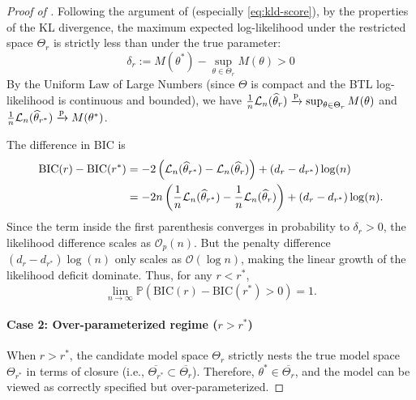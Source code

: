 \documentclass{article}
\begin{document}
\begin{bibunit}[unsrtnat]
\begin{proof}[Proof of ]
Following the argument of  (especially \eqref{eq:kld-score}), by the properties of the KL divergence, the maximum expected log-likelihood under the restricted space $\Theta_r$ is strictly less than under the true parameter:
\begin{equation*}
    \delta_r := M(\theta^*) - \sup_{\theta \in \Theta_r} M(\theta) > 0
\end{equation*}
By the Uniform Law of Large Numbers (since $\Theta$ is compact and the BTL log-likelihood is continuous and bounded), we have $\frac{1}{n}\mathcal{L}_n(\hat{\theta}_r) \pto \sup_{\theta \in \Theta_r} M(\theta)$ and $\frac{1}{n}\mathcal{L}_n(\hat{\theta}_{r^*}) \pto M(\theta^*)$. 

The difference in BIC is
\begin{align}
    \text{BIC}(r) - \text{BIC}(r^*) &= -2\left(\mathcal{L}_n(\hat{\theta}_{r^*}) - \mathcal{L}_n(\hat{\theta}_r)\right) + (d_r - d_{r^*})\log(n) \label{eq:bic-diff}
    \\
    &= -2n \left( \frac{1}{n}\mathcal{L}_n(\hat{\theta}_{r^*}) - \frac{1}{n}\mathcal{L}_n(\hat{\theta}_r) \right) + (d_r - d_{r^*})\log(n). \notag
\end{align}
Since the term inside the first parenthesis converges in probability to $\delta_r > 0$, the likelihood difference scales as $\mathcal{O}_p(n)$. But the penalty difference $(d_r - d_{r^*})\log(n)$ only scales as $\mathcal{O}(\log n)$, making the linear growth of the likelihood deficit dominate. Thus, for any $r < r^*$,
\begin{equation*}
    \lim_{n \to \infty} \mathbb{P}\left( \text{BIC}(r) - \text{BIC}(r^*) > 0 \right) = 1.
\end{equation*}

\paragraph{Case 2: Over-parameterized regime ($r > r^*$)}
When $r > r^*$, the candidate model space $\Theta_r$ strictly nests the true model space $\Theta_{r^*}$ in terms of closure (i.e., $\overline{\Theta_{r^*}} \subset \overline{\Theta_r}$). Therefore, $\theta^* \in \overline{\Theta_r}$, and the model can be viewed as correctly specified but over-parameterized.


\end{proof}
\end{bibunit}
\end{document}
